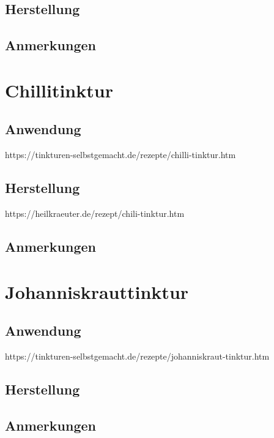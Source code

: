 \subsection{Herstellung}

\subsection{Anmerkungen}





\section{Chillitinktur}

\subsection{Anwendung}

https://tinkturen-selbstgemacht.de/rezepte/chilli-tinktur.htm

\subsection{Herstellung}

https://heilkraeuter.de/rezept/chili-tinktur.htm

\subsection{Anmerkungen}






\section{Johanniskrauttinktur}

\subsection{Anwendung}

https://tinkturen-selbstgemacht.de/rezepte/johanniskraut-tinktur.htm

\subsection{Herstellung}

\subsection{Anmerkungen}





